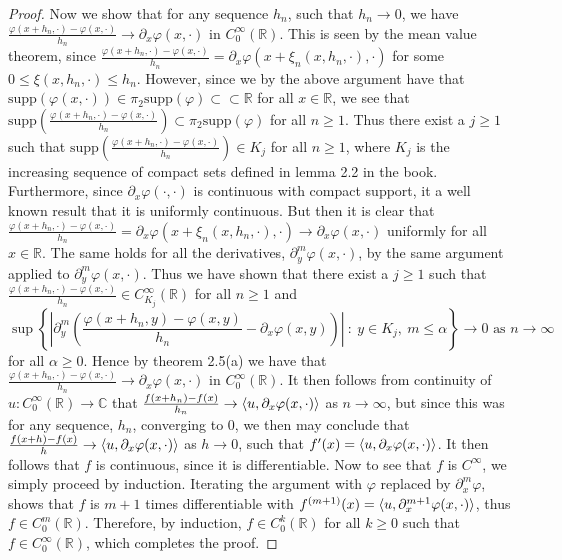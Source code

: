 \documentclass[a4paper,11pt]{article}
\newcommand{\supp}{\text{supp}}
\newcommand{\abs}[1]{\left\lvert #1 \right\rvert}
\newcommand{\R}{\mathbb{R}}
\newcommand{\C}{\mathbb{C}}
\numberwithin{equation}{section}
\begin{document}
\begin{proof}
	 Now we show that for any sequence $ h_n $, such that $ h_n\to 0 $, we have $ \frac{\varphi(x+h_n,\cdot)-\varphi(x,\cdot)}{h_n}\to\partial_x\varphi(x,\cdot) $ in $ C^\infty_0(\R) $. This is seen by the mean value theorem, since $ \frac{\varphi(x+h_n,\cdot)-\varphi(x,\cdot)}{h_n}=\partial_x\varphi(x+\xi_n(x,h_n,\cdot),\cdot) $ for some $ 0\leq\xi(x,h_n,\cdot)\leq h_n $. However, since we by the above argument have that $ \supp(\varphi(x,\cdot))\in\pi_2\supp(\varphi)\subset\subset\R $ for all $ x\in\R $, we see that $ \supp\left(\frac{\varphi(x+h_n,\cdot)-\varphi(x,\cdot)}{h_n}\right)\subset\pi_2\supp(\varphi) $ for all $ n\geq1 $. Thus there exist a $ j\geq1 $ such that $\supp\left(\frac{\varphi(x+h_n,\cdot)-\varphi(x,\cdot)}{h_n}\right)\in K_j  $ for all $ n\geq1 $, where $ K_j $ is the increasing sequence of compact sets defined in lemma 2.2 in the book. Furthermore, since $ \partial_x\varphi(\cdot,\cdot) $ is continuous with compact support, it a well known result that it is uniformly continuous. But then it is clear that $ \frac{\varphi(x+h_n,\cdot)-\varphi(x,\cdot)}{h_n}=\partial_x\varphi(x+\xi_n(x,h_n,\cdot),\cdot)\to\partial_x\varphi(x,\cdot) $ uniformly for all $ x\in \R $. The same holds for all the derivatives, $ \partial_y^m\varphi(x,\cdot) $, by the same argument applied to $ \partial_y^m\varphi(x,\cdot) $.
	 Thus we have shown that there exist a $ j\geq1 $ such that $ \frac{\varphi(x+h_n,\cdot)-\varphi(x,\cdot)}{h_n}\in C^\infty_{K_j}(\R) $ for all $ n\geq1 $ and \begin{equation}
	 \sup\left\{\abs{\partial^m_y\left(\frac{\varphi(x+h_n,y)-\varphi(x,y)}{h_n}-\partial_x\varphi(x,y)\right)}\ :\ y\in K_j,\ m\leq\alpha \right\}\to0 \text{ as }n\to\infty
	 \end{equation}
	 for all $ \alpha\geq0 $. Hence by theorem 2.5(a) we have that $ \frac{\varphi(x+h_n,\cdot)-\varphi(x,\cdot)}{h_n}\to \partial_x\varphi(x,\cdot) $ in $ C_0^\infty(\R) $.
	 It then follows from continuity of $ u: C^\infty_0(\R)\to\C $ that $ \frac{f(x+h_n)-f(x)}{h_n}\to\braket{u,\partial_x\varphi(x,\cdot)} $ as $ n\to\infty $, but since this was for any sequence, $ h_n $, converging to $ 0 $, we then may conclude that $ \frac{f(x+h)-f(x)}{h}\to \braket{u,\partial_x\varphi(x,\cdot)}$ as $ h\to 0 $, such that $ f'(x)=\braket{u,\partial_x\varphi(x,\cdot)} $. It then follows that $ f $ is continuous, since it is differentiable. Now to see that $ f $ is $ C^\infty $, we simply proceed by induction. Iterating the argument with $ \varphi $ replaced by $ \partial^m_x\varphi $, shows that $ f $ is $ m+1 $ times differentiable with $ f^{(m+1)}(x)=\braket{u,\partial^{m+1}_x\varphi(x,\cdot)} $, thus $ f\in C_0^m(\R) $. Therefore, by induction, $ f\in C^k_0(\R) $ for all $ k\geq0 $ such that $ f\in C^{\infty}_0(\R) $, which completes the proof.
\end{proof} 
\end{document}
